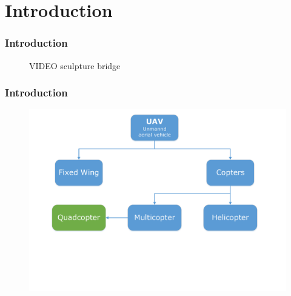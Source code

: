 \section{Introduction}

\begin{frame}
\frametitle{Introduction}
\begin{figure}[H]
  \begin{center}
  VIDEO sculpture bridge
  \end{center}
\end{figure}

\end{frame}




\begin{frame}
\frametitle{Introduction}
\begin{figure}[H]
  \begin{center}
  \includegraphics[scale=0.4]{fig/uav_groups.pdf}
  \end{center}
\end{figure}

\end{frame}




